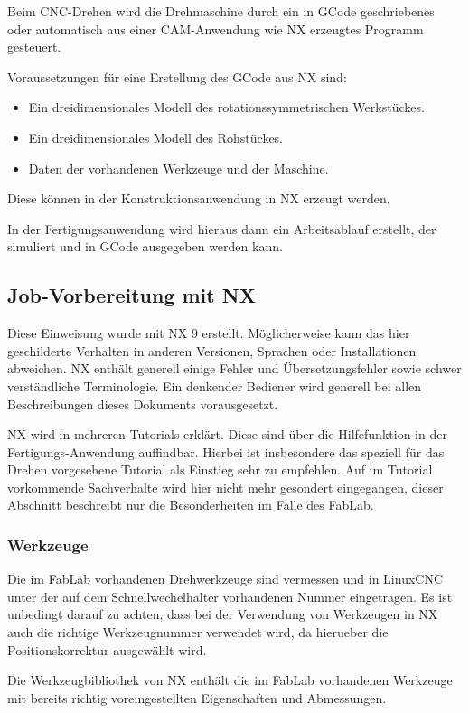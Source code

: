 \documentclass{\basedir/fablab-document}
\begin{document}
Beim CNC-Drehen wird die Drehmaschine durch ein in GCode geschriebenes oder automatisch aus einer CAM-Anwendung wie NX erzeugtes Programm gesteuert.

Voraussetzungen für eine Erstellung des GCode aus NX sind:
\begin{itemize}
	\item Ein dreidimensionales Modell des rotationssymmetrischen Werkstückes.
	\item Ein dreidimensionales Modell des Rohstückes.
	\item Daten der vorhandenen Werkzeuge und der Maschine.
\end{itemize}
Diese können in der Konstruktionsanwendung in NX erzeugt werden.

In der Fertigungsanwendung wird hieraus dann ein Arbeitsablauf erstellt, der simuliert und in GCode ausgegeben werden kann.

\subsection{Job-Vorbereitung mit NX}
Diese Einweisung wurde mit NX 9 erstellt. Möglicherweise kann das hier geschilderte Verhalten in anderen Versionen, Sprachen oder Installationen abweichen. NX enthält generell einige Fehler und Übersetzungsfehler sowie schwer verständliche Terminologie. Ein denkender Bediener wird generell bei allen Beschreibungen dieses Dokuments vorausgesetzt.

NX wird in mehreren Tutorials erklärt. Diese sind über die Hilfefunktion in der Fertigungs-Anwendung auffindbar. Hierbei ist insbesondere das speziell für das Drehen vorgesehene Tutorial als Einstieg sehr zu empfehlen. Auf im Tutorial vorkommende Sachverhalte wird hier nicht mehr gesondert eingegangen, dieser Abschnitt beschreibt nur die Besonderheiten im Falle des FabLab.

\subsubsection{Werkzeuge}

Die im FabLab vorhandenen Drehwerkzeuge sind vermessen und in LinuxCNC unter der auf dem Schnellwechelhalter vorhandenen Nummer eingetragen. Es ist unbedingt darauf zu achten, dass bei der Verwendung von Werkzeugen in NX auch die richtige Werkzeugnummer verwendet wird, da hierueber die Positionskorrektur ausgewählt wird.

Die Werkzeugbibliothek von NX enthält die im FabLab vorhandenen Werkzeuge mit bereits richtig voreingestellten Eigenschaften und Abmessungen. 
\end{document}
